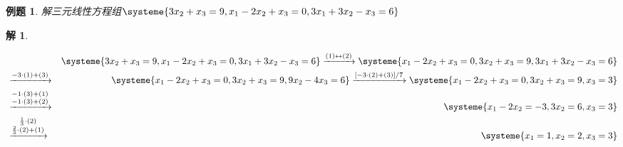 \documentclass[a4paper]{book}
\newtheorem{eg}{例题}[chapter]
\newtheorem*{solution}{解}
\begin{document}
\begin{eg}
解三元线性方程组$\systeme{3x_2 + x_3 = 9, x_1 - 2x_2 + x_3 = 0 , 3x_1 + 3x_2 - x_3 = 6}$
\end{eg}
\begin{solution}\

\begin{eqnarray*}
& & \systeme{3x_2 + x_3 = 9 , x_1 - 2x_2 + x_3 = 0 , 3x_1 + 3x_2 - x_3 = 6} \xrightarrow{(1)\leftrightarrow(2)} \systeme{x_1 - 2x_2 + x_3 = 0 , 3x_2 + x_3 = 9 , 3x_1 + 3x_2 - x_3 = 6} \\
& \xrightarrow{-3\cdot(1) + (3)} & \systeme{x_1 - 2x_2 + x_3 = 0, 3x_2 + x_3 = 9,  9x_2 - 4x_3 = 6} \xrightarrow{[-3\cdot(2)+(3)]/7} \systeme{x_1 - 2x_2 + x_3 = 0 , 3x_2 + x_3 = 9 , x_3 = 3} \\ & \xrightarrow{\substack{-1\cdot(3)+(1) \\ -1\cdot(3)+(2)}} & \systeme{x_1 - 2x_2 = -3 , 3x_2 = 6, x_3 = 3} \\
& \xrightarrow{\substack{\frac13\cdot(2) \\ \frac23\cdot(2)+(1)}} & \systeme{x_1 = 1, x_2 = 2, x_3 = 3}
\end{eqnarray*}
\end{solution}

\vspace{1.5em}
\end{document}

